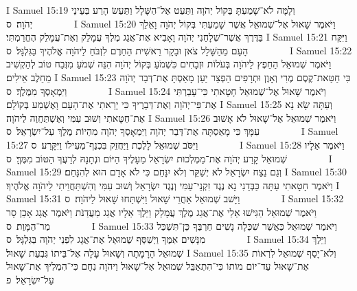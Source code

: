 I Samuel 15:19	וְלָמָּה לֹא־שָׁמַעְתָּ בְּקוֹל יְהֹוָה וַתַּעַט אֶל־הַשָּׁלָל וַתַּעַשׂ הָרַע בְּעֵינֵי יְהֹוָה׃ {ס}        
I Samuel 15:20	וַיֹּאמֶר שָׁאוּל אֶל־שְׁמוּאֵל אֲשֶׁר שָׁמַעְתִּי בְּקוֹל יְהֹוָה וָאֵלֵךְ בַּדֶּרֶךְ אֲשֶׁר־שְׁלָחַנִי יְהֹוָה וָאָבִיא אֶת־אֲגַג מֶלֶךְ עֲמָלֵק וְאֶת־עֲמָלֵק הֶחֱרַמְתִּי׃
I Samuel 15:21	וַיִּקַּח הָעָם מֵהַשָּׁלָל צֹאן וּבָקָר רֵאשִׁית הַחֵרֶם לִזְבֹּחַ לַיהֹוָה אֱלֹהֶיךָ בַּגִּלְגָּל׃ {ס}        
I Samuel 15:22	וַיֹּאמֶר שְׁמוּאֵל הַחֵפֶץ לַיהֹוָה בְּעֹלוֹת וּזְבָחִים כִּשְׁמֹעַ בְּקוֹל יְהֹוָה הִנֵּה שְׁמֹעַ מִזֶּבַח טוֹב לְהַקְשִׁיב מֵחֵלֶב אֵילִים׃
I Samuel 15:23	כִּי חַטַּאת־קֶסֶם מֶרִי וְאָוֶן וּתְרָפִים הַפְצַר יַעַן מָאַסְתָּ אֶת־דְּבַר יְהֹוָה וַיִּמְאָסְךָ מִמֶּלֶךְ׃ {ס}        
I Samuel 15:24	וַיֹּאמֶר שָׁאוּל אֶל־שְׁמוּאֵל חָטָאתִי כִּי־עָבַרְתִּי אֶת־פִּי־יְהֹוָה וְאֶת־דְּבָרֶיךָ כִּי יָרֵאתִי אֶת־הָעָם וָאֶשְׁמַע בְּקוֹלָם׃
I Samuel 15:25	וְעַתָּה שָׂא נָא אֶת־חַטָּאתִי וְשׁוּב עִמִּי וְאֶשְׁתַּחֲוֶה לַיהֹוָה׃
I Samuel 15:26	וַיֹּאמֶר שְׁמוּאֵל אֶל־שָׁאוּל לֹא אָשׁוּב עִמָּךְ כִּי מָאַסְתָּה אֶת־דְּבַר יְהֹוָה וַיִּמְאָסְךָ יְהֹוָה מִהְיוֹת מֶלֶךְ עַל־יִשְׂרָאֵל׃ {ס}        
I Samuel 15:27	וַיִּסֹּב שְׁמוּאֵל לָלֶכֶת וַיַּחֲזֵק בִּכְנַף־מְעִילוֹ וַיִּקָּרַע׃ {ס}        
I Samuel 15:28	וַיֹּאמֶר אֵלָיו שְׁמוּאֵל קָרַע יְהֹוָה אֶת־מַמְלְכוּת יִשְׂרָאֵל מֵעָלֶיךָ הַיּוֹם וּנְתָנָהּ לְרֵעֲךָ הַטּוֹב מִמֶּךָּ׃ {ס}        
I Samuel 15:29	וְגַם נֵצַח יִשְׂרָאֵל לֹא יְשַׁקֵּר וְלֹא יִנָּחֵם כִּי לֹא אָדָם הוּא לְהִנָּחֵם׃
I Samuel 15:30	וַיֹּאמֶר חָטָאתִי עַתָּה כַּבְּדֵנִי נָא נֶגֶד זִקְנֵי־עַמִּי וְנֶגֶד יִשְׂרָאֵל וְשׁוּב עִמִּי וְהִשְׁתַּחֲוֵיתִי לַיהֹוָה אֱלֹהֶיךָ׃
I Samuel 15:31	וַיָּשׁב שְׁמוּאֵל אַחֲרֵי שָׁאוּל וַיִּשְׁתַּחוּ שָׁאוּל לַיהֹוָה׃ {ס}        
I Samuel 15:32	וַיֹּאמֶר שְׁמוּאֵל הַגִּישׁוּ אֵלַי אֶת־אֲגַג מֶלֶךְ עֲמָלֵק וַיֵּלֶךְ אֵלָיו אֲגַג מַעֲדַנֹּת וַיֹּאמֶר אֲגָג אָכֵן סָר מַר־הַמָּוֶת׃ {ס}        
I Samuel 15:33	וַיֹּאמֶר שְׁמוּאֵל כַּאֲשֶׁר שִׁכְּלָה נָשִׁים חַרְבֶּךָ כֵּן־תִּשְׁכַּל מִנָּשִׁים אִמֶּךָ וַיְשַׁסֵּף שְׁמוּאֵל אֶת־אֲגָג לִפְנֵי יְהֹוָה בַּגִּלְגָּל׃ {ס}        
I Samuel 15:34	וַיֵּלֶךְ שְׁמוּאֵל הָרָמָתָה וְשָׁאוּל עָלָה אֶל־בֵּיתוֹ גִּבְעַת שָׁאוּל׃
I Samuel 15:35	וְלֹא־יָסַף שְׁמוּאֵל לִרְאוֹת אֶת־שָׁאוּל עַד־יוֹם מוֹתוֹ כִּי־הִתְאַבֵּל שְׁמוּאֵל אֶל־שָׁאוּל וַיהֹוָה נִחָם כִּי־הִמְלִיךְ אֶת־שָׁאוּל עַל־יִשְׂרָאֵל׃ {פ}
